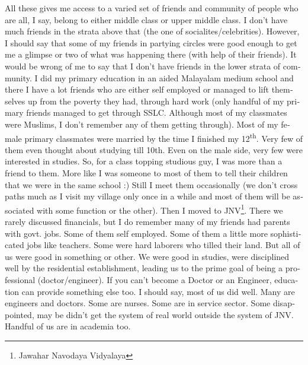 \begin{english}
All these gives me access to a varied set of friends and community of people who are all, I say, 
belong to either middle class or upper middle class. I don't have much friends in the strata above 
that (the one of socialites/celebrities). However, I should say that some of my friends in partying circles 
were good enough to get me a glimpse or two of what was happening there (with help of their friends). 
It would be wrong of me to say that I don't have friends in the lower strata of community. I did my primary education 
in an aided Malayalam medium school and there I have a lot friends who are either self employed 
or managed to lift themselves up from the poverty they had, through hard work (only handful of my 
primary friends managed to get through SSLC. Although most of my classmates were Muslims, I don't 
remember any of them getting through). Most of my female primary classmates were married by the time 
I finished my 12\textsuperscript{th}. Very few of them even thought about studying till 10th. Even on the male side, 
very few were interested in studies. So, for a class topping studious guy, I was more than a friend 
to them. More like I was someone to most of them to tell their children that we were in the same school :) Still 
I meet them occasionally (we don't cross paths much as I visit my village only once in a while 
and most of them will be associated with some function or the other). Then I moved to JNV\footnote{Jawahar Navodaya Vidyalaya}. There we rarely discussed financials, but I do remember many of my friends had
parents with govt. jobs. Some of them self employed. Some of them a little more sophisticated jobs
like teachers. Some were hard laborers who tilled their land. But all of us were good in something 
or other. We were good in
studies, were disciplined well by the residential establishment, leading us to the prime goal of 
being a professional (doctor/engineer). If you can't become a Doctor or an Engineer, education can provide something else too. I should say, most of us did well. Many are engineers and doctors. Some are nurses. 
Some are in service sector. Some disappointed, may be didn't get the system of real world outside 
the system of JNV. Handful of us are in academia too. 


\end{english}
